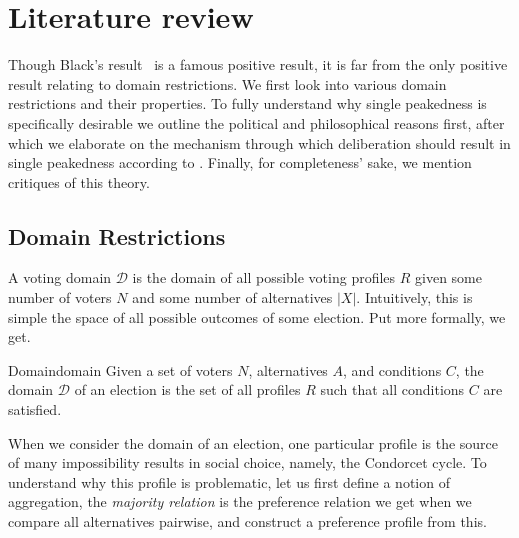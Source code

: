 \newpage
\chapter{Literature review}
\label{Literature}


Though Black's result~\citep{blackRationaleGroupDecisionmaking1948} is a famous positive result, it is far from the only positive result relating to domain restrictions. We first look into various domain restrictions and their properties. To fully understand why single peakedness is specifically desirable we outline the political and philosophical reasons first, after which we elaborate on the mechanism through which deliberation should result in single peakedness according to \citet{listTwoConceptsAgreement2002}. Finally, for completeness' sake, we mention critiques of this theory.

\section{Domain Restrictions}
A voting domain $\mathcal{D}$ is the domain of all possible voting profiles \(R\) given some number of voters $N$ and some number of alternatives $|X|$. Intuitively, this is simple the space of all possible outcomes of some election. Put more formally, we get.

\begin{definition}{Domain}{domain}
	{
		Given a set of voters $N$, alternatives $A$, and conditions $C$, the domain $\mathcal{D}$ of an election is the set of all profiles $R$ such that all conditions $C$ are satisfied.
	}
\end{definition}

When we consider the domain of an election, one particular profile is the source of many impossibility results in social choice, namely, the Condorcet cycle. To understand why this profile is problematic, let us first define a notion of aggregation, the \textit{majority relation} is the preference relation we get when we compare all alternatives pairwise, and construct a preference profile from this.

